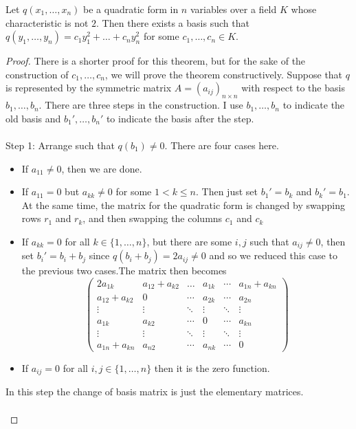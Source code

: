 \begin{thm}{}{} Let $q(x_1,\dots,x_n)$ be a quadratic form in $n$ variables over a field $K$ whose characteristic is not $2$. Then there exists a basis such that $q(y_1,\dots,y_n)=c_1y_1^2+\dots+c_ny_n^2$ for some $c_1,\dots,c_n\in K$. \tcbline
\begin{proof}
There is a shorter proof for this theorem, but for the sake of the construction of $c_1,\dots,c_n$, we will prove the theorem constructively. Suppose that $q$ is represented by the symmetric matrix $A=(a_{ij})_{n\times n}$ with respect to the basis $b_1,\dots,b_n$. There are three steps in the construction. I use $b_1,\dots,b_n$ to indicate the old basis and $b_1',\dots,b_n'$ to indicate the basis after the step. \\~\\
Step 1: Arrange such that $q(b_1)\neq 0$. There are four cases here. 
\begin{itemize}
\item If $a_{11}\neq 0$, then we are done. 
\item If $a_{11}=0$ but $a_{kk}\neq 0$ for some $1<k\leq n$. Then just set $b_1'=b_k$ and $b_k'=b_1$. At the same time, the matrix for the quadratic form is changed by swapping rows $r_1$ and $r_k$, and then swapping the columns $c_1$ and $c_k$
\item If $a_{kk}=0$ for all $k\in\{1,\dots,n\}$, but there are some $i,j$ such that $a_{ij}\neq 0$, then set $b_i'=b_i+b_j$ since $q(b_i+b_j)=2a_{ij}\neq 0$ and so we reduced this case to the previous two cases.The matrix then becomes $$\begin{pmatrix}
2a_{1k} & a_{12}+a_{k2} & \dots & a_{1k} & \cdots & a_{1n}+a_{kn} \\
 a_{12}+a_{k2} & 0 & \cdots & a_{2k} & \cdots & a_{2n} \\
\vdots & \vdots & \ddots & \vdots & \ddots & \vdots \\
a_{1k} & a_{k2} & \cdots & 0 & \cdots & a_{kn}\\
\vdots & \vdots & \ddots & \vdots & \ddots & \vdots \\
a_{1n}+a_{kn} & a_{n2} & \cdots & a_{nk} & \cdots & 0
\end{pmatrix}$$
\item If $a_{ij}=0$ for all $i,j\in\{1,\dots,n\}$ then it is the zero function. 
\end{itemize}
In this step the change of basis matrix is just the elementary matrices. \\~\\


\end{proof}
\end{thm}
